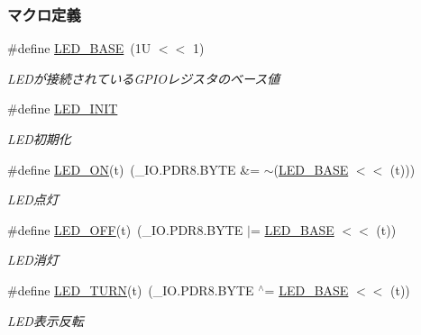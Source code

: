 \subsubsection*{マクロ定義}
\begin{DoxyCompactItemize}
\item 
\#define \hyperlink{led_8h_ac2c029b1f7239de0df5bb5d18661d5d0_ac2c029b1f7239de0df5bb5d18661d5d0}{L\+E\+D\+\_\+\+B\+A\+S\+E}~(1\+U $<$$<$ 1)
\begin{DoxyCompactList}\small\item\em L\+E\+Dが接続されている\+G\+P\+I\+Oレジスタのベース値 \end{DoxyCompactList}\item 
\#define \hyperlink{led_8h_a1f0e386ef1dfc57ee3b3aad637fff932_a1f0e386ef1dfc57ee3b3aad637fff932}{L\+E\+D\+\_\+\+I\+N\+I\+T}
\begin{DoxyCompactList}\small\item\em L\+E\+D初期化 \end{DoxyCompactList}\item 
\#define \hyperlink{led_8h_a22da7f6a1189952d15f0dad98650d66d_a22da7f6a1189952d15f0dad98650d66d}{L\+E\+D\+\_\+\+O\+N}(t)~(\+\_\+\+I\+O.\+P\+D\+R8.\+B\+Y\+T\+E \&= $\sim$(\hyperlink{led_8h_ac2c029b1f7239de0df5bb5d18661d5d0_ac2c029b1f7239de0df5bb5d18661d5d0}{L\+E\+D\+\_\+\+B\+A\+S\+E} $<$$<$ (t)))
\begin{DoxyCompactList}\small\item\em L\+E\+D点灯 \end{DoxyCompactList}\item 
\#define \hyperlink{led_8h_a62bba2f9c4e7d65d04151ac924de5e13_a62bba2f9c4e7d65d04151ac924de5e13}{L\+E\+D\+\_\+\+O\+F\+F}(t)~(\+\_\+\+I\+O.\+P\+D\+R8.\+B\+Y\+T\+E $\vert$= \hyperlink{led_8h_ac2c029b1f7239de0df5bb5d18661d5d0_ac2c029b1f7239de0df5bb5d18661d5d0}{L\+E\+D\+\_\+\+B\+A\+S\+E} $<$$<$ (t))
\begin{DoxyCompactList}\small\item\em L\+E\+D消灯 \end{DoxyCompactList}\item 
\#define \hyperlink{led_8h_a63ff3d552ff396f9054d631f67dd6f77_a63ff3d552ff396f9054d631f67dd6f77}{L\+E\+D\+\_\+\+T\+U\+R\+N}(t)~(\+\_\+\+I\+O.\+P\+D\+R8.\+B\+Y\+T\+E $^\wedge$= \hyperlink{led_8h_ac2c029b1f7239de0df5bb5d18661d5d0_ac2c029b1f7239de0df5bb5d18661d5d0}{L\+E\+D\+\_\+\+B\+A\+S\+E} $<$$<$ (t))
\begin{DoxyCompactList}\small\item\em L\+E\+D表示反転 \end{DoxyCompactList}\end{DoxyCompactItemize}
